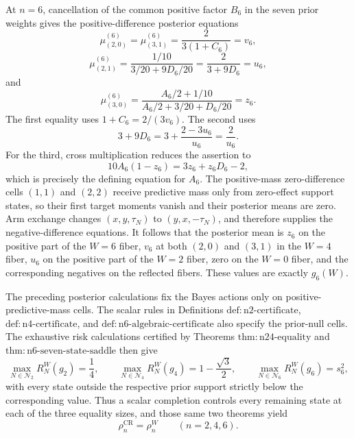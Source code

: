 At \(n=6\), cancellation of the common positive factor \(B_6\) in the seven prior weights gives the positive-difference posterior equations
\[
 \mu_{(2,0)}^{(6)}=\mu_{(3,1)}^{(6)}
 =\frac{2}{3(1+C_6)}=v_6,
\]
\[
 \mu_{(2,1)}^{(6)}
 =\frac{1/10}{3/20+9D_6/20}
 =\frac{2}{3+9D_6}=u_6,
\]
and
\[
 \mu_{(3,0)}^{(6)}
 =\frac{A_6/2+1/10}{A_6/2+3/20+D_6/20}=z_6.
\]
The first equality uses \(1+C_6=2/(3v_6)\).  The second uses
\[
 3+9D_6
 =3+\frac{2-3u_6}{u_6}
 =\frac2{u_6}.
\]
For the third, cross multiplication reduces the assertion to
\[
 10A_6(1-z_6)=3z_6+z_6D_6-2,
\]
which is precisely the defining equation for \(A_6\).  The positive-mass zero-difference cells \((1,1)\) and \((2,2)\) receive predictive mass only from zero-effect support states, so their first target moments vanish and their posterior means are zero.  Arm exchange changes \((x,y,\tau_N)\) to \((y,x,-\tau_N)\), and therefore supplies the negative-difference equations.  It follows that the posterior mean is \(z_6\) on the positive part of the \(W=6\) fiber, \(v_6\) at both \((2,0)\) and \((3,1)\) in the \(W=4\) fiber, \(u_6\) on the positive part of the \(W=2\) fiber, zero on the \(W=0\) fiber, and the corresponding negatives on the reflected fibers.  These values are exactly \(g_6(W)\).

The preceding posterior calculations fix the Bayes actions only on positive-predictive-mass cells.  The scalar rules in Definitions
\(\mathrm{def{:}n2\mbox{-}certificate}\),
\(\mathrm{def{:}n4\mbox{-}certificate}\), and
\(\mathrm{def{:}n6\mbox{-}algebraic\mbox{-}certificate}\)
also specify the prior-null cells.  The exhaustive risk calculations certified by Theorems
\(\mathrm{thm{:}n24\mbox{-}equality}\) and
\(\mathrm{thm{:}n6\mbox{-}seven\mbox{-}state\mbox{-}saddle}\)
then give
\[
 \max_{N\in\mathcal N_2}R_N^W(g_2)=\frac14,\qquad
 \max_{N\in\mathcal N_4}R_N^W(g_4)=1-\frac{\sqrt3}{2},\qquad
 \max_{N\in\mathcal N_6}R_N^W(g_6)=s_6^2,
\]
with every state outside the respective prior support strictly below the corresponding value.  Thus a scalar completion controls every remaining state at each of the three equality sizes, and those same two theorems yield
\[
 \rho_n^{\mathrm{CR}}=\rho_n^W\qquad(n=2,4,6).
\]

